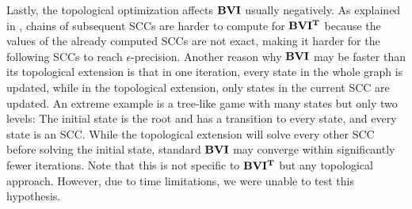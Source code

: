Lastly, the topological optimization affects $\mathbf{BVI}$ usually negatively. As explained in \cite{gandalf}, 
chains of subsequent SCCs are harder to compute for $\mathbf{BVI^T}$ because the values of the already computed SCCs are not exact, 
making it harder for the following SCCs to reach $\epsilon$-precision.
Another reason why $\mathbf{BVI}$ may be faster than its topological extension is that in one iteration, every state in the whole graph is updated, 
while in the topological extension, only states in the current SCC are updated.
An extreme example is a tree-like game with many states but only two levels: 
The initial state is the root and has a transition to every state, and every state is an SCC.
While the topological extension will solve every other SCC before solving the initial state, standard $\mathbf{BVI}$ may converge within significantly fewer iterations.
Note that this is not specific to $\mathbf{BVI^T}$ but any topological approach.
However, due to time limitations, we were unable to test this hypothesis.
\FloatBarrier


